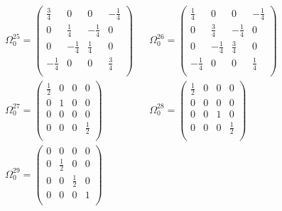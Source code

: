 \begin{align*}
    \Omega_{0}^{25} = 
    \begin{pmatrix}
    \frac{3}{4}  &  0  &  0  &  -\frac{1}{4}  \\
    0  &  \frac{1}{4}  &  -\frac{1}{4}  &  0  \\
    0  &  -\frac{1}{4}  &  \frac{1}{4}  &  0  \\
    -\frac{1}{4}  &  0  &  0  &  \frac{3}{4}  \\
    \end{pmatrix}
    &&
    \Omega_{0}^{26} = 
    \begin{pmatrix}
    \frac{1}{4}  &  0  &  0  &  -\frac{1}{4}  \\
    0  &  \frac{3}{4}  &  -\frac{1}{4}  &  0  \\
    0  &  -\frac{1}{4}  &  \frac{3}{4}  &  0  \\
    -\frac{1}{4}  &  0  &  0  &  \frac{1}{4}  \\
    \end{pmatrix}
    \\
    \Omega_{0}^{27} = 
    \begin{pmatrix}
    \frac{1}{2}  &  0  &  0  &  0  \\
    0  &  1  &  0  &  0  \\
    0  &  0  &  0  &  0  \\
    0  &  0  &  0  &  \frac{1}{2}  \\
    \end{pmatrix}
    &&
    \Omega_{0}^{28} = 
    \begin{pmatrix}
    \frac{1}{2}  &  0  &  0  &  0  \\
    0  &  0  &  0  &  0  \\
    0  &  0  &  1  &  0  \\
    0  &  0  &  0  &  \frac{1}{2}  \\
    \end{pmatrix}
    \\
    \Omega_{0}^{29} = 
    \begin{pmatrix}
    0  &  0  &  0  &  0  \\
    0  &  \frac{1}{2}  &  0  &  0  \\
    0  &  0  &  \frac{1}{2}  &  0  \\
    0  &  0  &  0  &  1  \\
    \end{pmatrix}
    &
\end{align*}

\newpage

